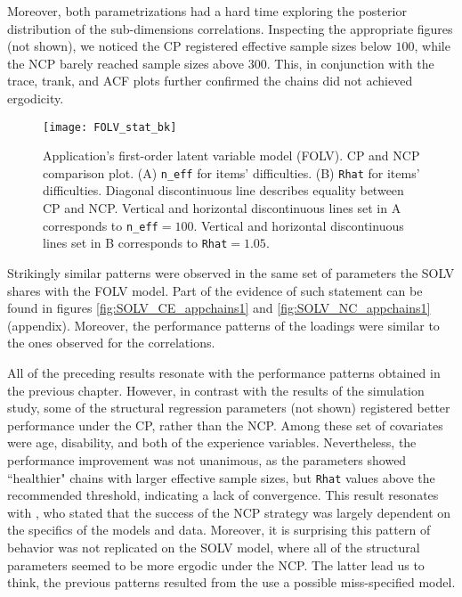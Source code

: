 Moreover, both parametrizations had a hard time exploring the posterior distribution of the sub-dimensions correlations. Inspecting the appropriate figures (not shown), we noticed the CP registered effective sample sizes below $100$, while the NCP barely reached sample sizes above $300$. This, in conjunction with the trace, trank, and ACF plots further confirmed the chains did not achieved ergodicity.
%
\begin{figure}[H]
	\centering
	\texttt{[image: FOLV\_stat\_bk]}
	\caption[Application's first-order latent variable model (FOLV). CP and NCP comparison plot.]%
	{Application's first-order latent variable model (FOLV). CP and NCP comparison plot. (A) \texttt{n\_eff} for items' difficulties. (B) \texttt{Rhat} for items' difficulties. Diagonal discontinuous line describes equality between CP and NCP. Vertical and horizontal discontinuous lines set in A corresponds to \texttt{n\_eff}$=100$. Vertical and horizontal discontinuous lines set in B corresponds to \texttt{Rhat}$=1.05$.}
	\label{fig:FOLV_stat1}
\end{figure}

Strikingly similar patterns were observed in the same set of parameters the SOLV shares with the FOLV model. Part of the evidence of such statement can be found in figures \ref{fig:SOLV_CE_appchains1} and \ref{fig:SOLV_NC_appchains1} (appendix). Moreover, the performance patterns of the loadings were similar to the ones observed for the correlations.

All of the preceding results resonate with the performance patterns obtained in the previous chapter. However, in contrast with the results of the simulation study, some of the structural regression parameters (not shown) registered better performance under the CP, rather than the NCP. Among these set of covariates were age, disability, and both of the experience variables. Nevertheless, the performance improvement was not unanimous, as the parameters showed ``healthier" chains with larger effective sample sizes, but \texttt{Rhat} values above the recommended threshold, indicating a lack of convergence. This result resonates with \citet{Papaspiliopoulos_et_al_2007}, who stated that the success of the NCP strategy was largely dependent on the specifics of the models and data. Moreover, it is surprising this pattern of behavior was not replicated on the SOLV model, where all of the structural parameters seemed to be more ergodic under the NCP. The latter lead us to think, the previous patterns resulted from the use a possible miss-specified model.

